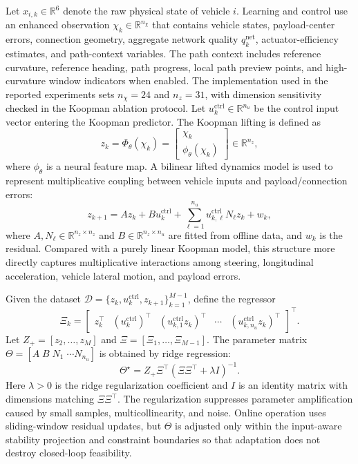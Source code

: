 \documentclass[twocolumn,3p,times,procedia]{elsarticle}
\newcommand{\R}{\mathbb{R}}
\begin{document}
Let $x_{i,k}\in\R^6$ denote the raw physical state of vehicle $i$. Learning and control use an enhanced observation $\chi_k\in\R^{n_\chi}$ that contains vehicle states, payload-center errors, connection geometry, aggregate network quality $q_k^{\mathrm{net}}$, actuator-efficiency estimates, and path-context variables. The path context includes reference curvature, reference heading, path progress, local path preview points, and high-curvature window indicators when enabled. The implementation used in the reported experiments sets $n_\chi=24$ and $n_z=31$, with dimension sensitivity checked in the Koopman ablation protocol. Let $u_k^{\mathrm{ctrl}}\in\R^{n_u}$ be the control input vector entering the Koopman predictor. The Koopman lifting is defined as
\begin{equation}
z_k=\Phi_\theta(\chi_k)=\begin{bmatrix}\chi_k\\ \phi_\theta(\chi_k)\end{bmatrix}\in\R^{n_z},
\label{eq:koopman_lift}
\end{equation}
where $\phi_\theta$ is a neural feature map. A bilinear lifted dynamics model is used to represent multiplicative coupling between vehicle inputs and payload/connection errors:
\begin{equation}
z_{k+1}=A z_k+B u_k^{\mathrm{ctrl}}+\sum_{\ell=1}^{n_u} u_{k,\ell}^{\mathrm{ctrl}} N_\ell z_k+w_k,
\label{eq:bilinear_koopman}
\end{equation}
where $A,N_\ell\in\R^{n_z\times n_z}$ and $B\in\R^{n_z\times n_u}$ are fitted from offline data, and $w_k$ is the residual. Compared with a purely linear Koopman model, this structure more directly captures multiplicative interactions among steering, longitudinal acceleration, vehicle lateral motion, and payload errors.

Given the dataset $\mathcal D=\{z_k,u_k^{\mathrm{ctrl}},z_{k+1}\}_{k=1}^{M-1}$, define the regressor
\begin{equation}
\Xi_k=\begin{bmatrix}z_k^\top&(u_k^{\mathrm{ctrl}})^\top&(u_{k,1}^{\mathrm{ctrl}}z_k)^\top&\cdots&(u_{k,n_u}^{\mathrm{ctrl}}z_k)^\top\end{bmatrix}^\top .
\label{eq:bilinear_regressor}
\end{equation}
Let $Z_+=[z_2,\ldots,z_M]$ and $\Xi=[\Xi_1,\ldots,\Xi_{M-1}]$. The parameter matrix $\Theta=[A\;B\;N_1\;\cdots N_{n_u}]$ is obtained by ridge regression:
\begin{equation}
\Theta^\star=Z_+\Xi^\top(\Xi\Xi^\top+\lambda I)^{-1}.
\label{eq:ridge_fit}
\end{equation}
Here $\lambda>0$ is the ridge regularization coefficient and $I$ is an identity matrix with dimensions matching $\Xi\Xi^\top$. The regularization suppresses parameter amplification caused by small samples, multicollinearity, and noise. Online operation uses sliding-window residual updates, but $\Theta$ is adjusted only within the input-aware stability projection and constraint boundaries so that adaptation does not destroy closed-loop feasibility.
\end{document}
